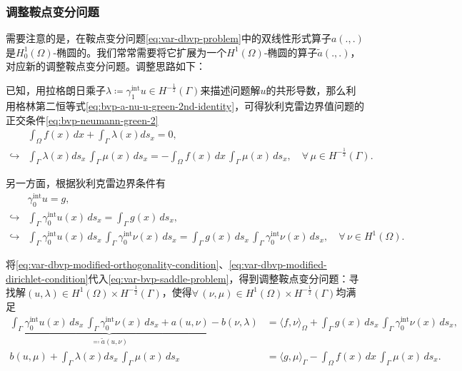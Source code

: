 \subsubsection{调整鞍点变分问题}
\label{sec:var-bvp-saddle-modified}
需要注意的是，在鞍点变分问题\eqref{eq:var-dbvp-problem}中的双线性形式算子$a(.,.)$是$H_{0}^{1}(\Omega)$-椭圆的。我们常常需要将它扩展为一个$H^1(\Omega)$-椭圆的算子$\tilde{a}(.,.)$，对应新的调整鞍点变分问题。调整思路如下：

已知，用拉格朗日乘子$\lambda \coloneqq \gamma_{1}^{\text{int}}u \in H^{-\frac{1}{2}}(\Gamma)$来描述问题解$u$的共形导数，那么利用格林第二恒等式\eqref{eq:bvp-a-nu-u-green-2nd-identity}，可得狄利克雷边界值问题的正交条件\eqref{eq:bvp-neumann-green-2}
\begin{equation}
\begin{split}
  \label{eq:var-dbvp-modified-orthogonality-condition}
  &\int_{\Omega} f(x) \, dx + \int_{\Gamma} \lambda(x) d s_x = 0, \\
  \hookrightarrow &\int_{\Gamma} \lambda(x) d s_x \, \int_{\Gamma} \mu(x) \, d s_x = - \int_{\Omega} f(x) \, dx \, \int_{\Gamma} \mu(x) \, d s_x , \quad \forall \, \mu \in H^{-\frac{1}{2}}(\Gamma).
\end{split}
\end{equation}

另一方面，根据狄利克雷边界条件有
\begin{equation}
  \label{eq:var-dbvp-modified-dirichlet-condition}
  \begin{split}
    &\gamma_{0}^{\text{int}} u = g, \\
    \hookrightarrow & \int_{\Gamma} \gamma_{0}^{\text{int}} u(x) \, d s_x
    = \int_{\Gamma} g(x) \, d s_x, \\
    \hookrightarrow & \int_{\Gamma} \gamma_{0}^{\text{int}} u(x) \, d s_x \,
    \int_{\Gamma} \gamma_{0}^{\text{int}} \nu(x) \, d s_x
    = \int_{\Gamma} g(x) \, d s_x \,
    \int_{\Gamma} \gamma_{0}^{\text{int}} \nu(x) \, d s_x, \quad \forall \, \nu \in H^{1}(\Omega).
  \end{split}
\end{equation}

  将\eqref{eq:var-dbvp-modified-orthogonality-condition}、\eqref{eq:var-dbvp-modified-dirichlet-condition}代入\eqref{eq:var-bvp-saddle-problem}，得到调整鞍点变分问题：寻找解$(u,\lambda) \in H^{1}(\Omega) \times H^{-\frac{1}{2}}(\Gamma)$，使得$\forall \, (\nu, \mu) \in H^{1}(\Omega) \times H^{-\frac{1}{2}}(\Gamma)$均满足
  \begin{equation}
    \label{eq:var-bvp-saddle-modified-problem}
    \begin{split}
      \underbrace{
      \int_{\Gamma} \gamma_{0}^{\text{int}} u(x) \, d s_x \,
    \int_{\Gamma} \gamma_{0}^{\text{int}} \nu(x) \, d s_x + a(u,\nu)
    }_{\eqqcolon \tilde{a}(u,\nu)}
    - b(\nu,\lambda) &= \langle f,\nu \rangle_{\Omega}  + \int_{\Gamma} g(x) \, d s_x \,
    \int_{\Gamma} \gamma_{0}^{\text{int}} \nu(x) \, d s_x,\\
      b(u,\mu) + \int_{\Gamma} \lambda(x) d s_x \, \int_{\Gamma} \mu(x) \, d s_x  &= \langle g, \mu \rangle_{\Gamma} - \int_{\Omega} f(x) \, dx \, \int_{\Gamma} \mu(x) \, d s_x .
    \end{split}
  \end{equation}

